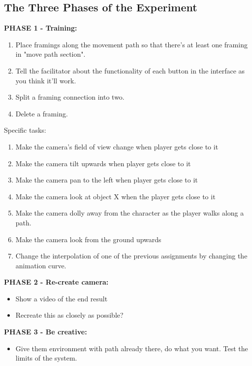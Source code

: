 \subsection{The Three Phases of the Experiment}
\textbf{PHASE 1 - Training:}
\begin{enumerate}
\item Place framings along the movement path so that there's at least one framing in "move path section".
\item Tell the facilitator about the functionality of each button in the interface as you think it'll work.
\item Split a framing connection into two.
\item Delete a framing.
\end{enumerate}

Specific tasks:
\begin{enumerate}
\item Make the camera's field of view change when player gets close to it
\item Make the camera tilt upwards when player gets close to it
\item Make the camera pan to the left when player gets close to it
\item Make the camera look at object X when the player gets close to it
\item Make the camera dolly away from the character as the player walks along a path.
\item Make the camera look from the ground upwards
\item Change the interpolation of one of the previous assignments by changing the animation curve.
\end{enumerate}

\textbf{PHASE 2 - Re-create camera:}
\begin{itemize}
\item Show a video of the end result
\item Recreate this as closely as possible?
\end{itemize}

\textbf{PHASE 3 - Be creative:}
\begin{itemize}
\item Give them environment with path already there, do what you want. Test the limits of the system.
\end{itemize}
